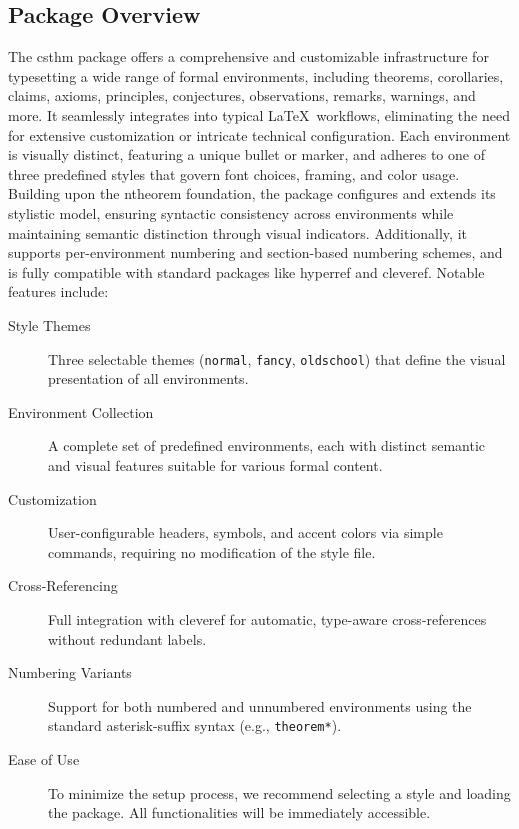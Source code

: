\documentclass[10pt,letterpaper]{amsart}
\begin{document}
\subsection{Package Overview}

The \textsf{csthm} package offers a comprehensive and customizable
infrastructure for typesetting a wide range of formal environments, including
theorems, corollaries, claims, axioms, principles, conjectures, observations,
remarks, warnings, and more. It seamlessly integrates into typical \LaTeX\
workflows, eliminating the need for extensive customization or intricate
technical configuration. Each environment is visually distinct, featuring a
unique bullet or marker, and adheres to one of three predefined styles that
govern font choices, framing, and color usage. Building upon the
\textsf{ntheorem} foundation, the package configures and extends its
stylistic model, ensuring syntactic consistency across environments while
maintaining semantic distinction through visual indicators. Additionally, it
supports per-environment numbering and section-based numbering schemes, and is
fully compatible with standard packages like \textsf{hyperref} and
\textsf{cleveref}. Notable features include:

\begin{description}
	\item[Style Themes] Three selectable themes (\texttt{normal}, \texttt{fancy},
	      \texttt{oldschool}) that define the visual presentation of all environments.
	\item[Environment Collection] A complete set of predefined environments, each with
	      distinct semantic and visual features suitable for various formal content.
	\item[Customization] User-configurable headers, symbols, and accent colors via simple
	      commands, requiring no modification of the style file.
	\item[Cross-Referencing] Full integration with \textsf{cleveref} for automatic,
	      type-aware cross-references without redundant labels.
	\item[Numbering Variants] Support for both numbered and unnumbered environments using
	      the standard asterisk-suffix syntax (e.g., \texttt{theorem*}).
	\item[Ease of Use] To minimize the setup process, we recommend selecting a style and
	      loading the package. All functionalities will be immediately accessible.
\end{description}
\end{document}
